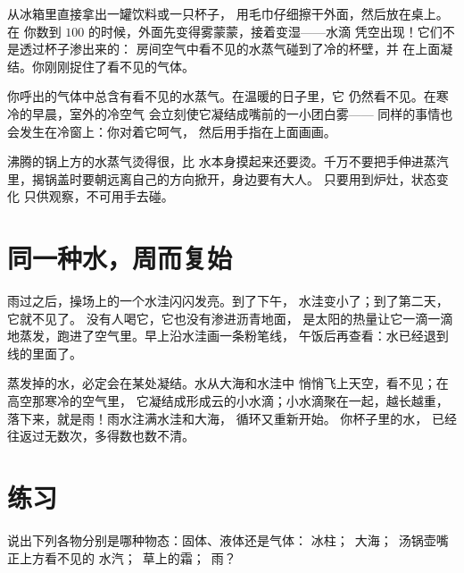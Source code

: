 \begin{example}\label{ex:g2:ice-water-steam:catch}
从冰箱里直接拿出一罐饮料或一只杯子，
用毛巾仔细擦干外面，然后放在桌上。在
你数到 $100$ 的时候，外面先变得雾蒙蒙，接着变湿——水滴
凭空出现！它们不是透过杯子渗出来的：
房间空气中看不见的水蒸气碰到了冷的杯壁，并
在上面凝结。你刚刚捉住了看不见的气体。
\end{example}

\begin{example}[呼气成雾]\label{ex:g2:ice-water-steam:breath}
你呼出的气体中总含有看不见的水蒸气。在温暖的日子里，它
仍然看不见。在寒冷的早晨，室外的冷空气
会立刻使它凝结成嘴前的一小团白雾——
同样的事情也会发生在冷窗上：你对着它呵气，
然后用手指在上面画画。
\end{example}

\begin{remark}\label{rem:g2:ice-water-steam:safety}
沸腾的锅上方的水蒸气烫得很，比
水本身摸起来还要烫。千万不要把手伸进蒸汽里，揭锅盖时要朝远离自己的方向掀开，身边要有大人。
只要用到炉灶，状态变化
只供观察，不可用手去碰。
\end{remark}

\section{同一种水，周而复始}

\begin{example}[水洼变小了]\label{ex:g2:ice-water-steam:puddle}
雨过之后，操场上的一个水洼闪闪发亮。到了下午，
水洼变小了；到了第二天，它就不见了。
没有人喝它，它也没有渗进沥青地面，
是太阳的热量让它一滴一滴地蒸发，跑进了空气里。早上沿水洼画一条粉笔线，
午饭后再查看：水已经退到线的里面了。
\end{example}

\begin{example}[从海洋到雨水]\label{ex:g2:ice-water-steam:cycle}
蒸发掉的水，必定会在某处凝结。水从大海和水洼中
悄悄飞上天空，看不见；在高空那寒冷的空气里，
它凝结成形成云的小水滴；小水滴聚在一起，越长越重，落下来，就是雨！雨水注满水洼和大海，
循环又重新开始。
你杯子里的水，
已经往返过无数次，多得数也数不清。
\end{example}

\section{练习}

\begin{exercise}[$\star$]\label{exo:g2:ice-water-steam:1}
说出下列各物分别是哪种物态：固体、液体还是气体：
冰柱；\ 大海；\ 汤锅壶嘴正上方看不见的
水汽；\ 草上的霜；\ 雨？
\end{exercise}

